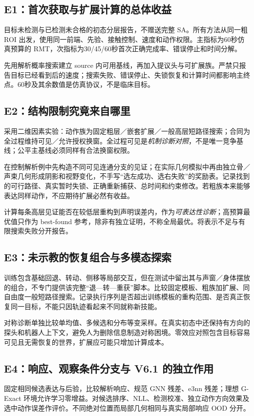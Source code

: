\documentclass[UTF8,fontset=fandol,11pt,a4paper]{ctexart}
\theoremstyle{plain}
\theoremstyle{definition}
\theoremstyle{remark}
\numberwithin{equation}{section}
\begin{document}
\subsection{E1：首次获取与扩展计算的总体收益}
目标未检测与已检测未合格的初态分层报告，不赠送完整 SA。所有方法从同一粗 ROI 出发，使用同一前端、先验、接触控制、速度和动作权限。主指标为60秒仿真预算的 RMT，次指标为30/45/60秒首次正确完成率、错误停止和时间分解。

先用解析概率搜索建立 source 内可用基线，再加入提议头与可扩展族。严禁只报告目标已经看到后的速度；搜索失败、错误停止、失锁恢复和计算时间都影响主终点。60秒及其余数值是仿真协议，不是临床目标。

\subsection{E2：结构限制究竟来自哪里}
采用二维因素实验：动作族为固定粗层／嵌套扩展／一般高层短路径搜索；合同为全过程维持可见／允许授权换窗。全过程可见是\emph{机制诊断对照}，不是唯一竞争基线；公平主基线必须同样有合法换窗权限。

在控制解析例中先构造不同可见连通分支的见证；在实际几何模拟中再由独立骨／声束几何形成阴影和视野变化，不手写“选左成功、选右失败”的奖励表。记录找到的可行路径、真实暂时失锁、正确重新捕获、总时间和约束修改。若粗族本来能够表达同样动作，不应期待扩展必然有收益。

计算每条高层见证能否在较低层重构到声明误差内，作为\emph{可表达性诊断}；高预算最优值只作为 best-found 参考，除非有独立证明，不称全局最优。将表示不足与有限搜索失败分开报告。

\subsection{E3：未示教的恢复组合与多模态探索}
训练包含基础回退、转动、侧移等局部交互，但在测试中留出其与声窗／身体摆放的组合，不专门提供该完整“退—转—重获”脚本。比较固定模板、粗族加扩展、同自由度一般短路径搜索。记录执行序列是否超出训练模板的重构范围、是否真正恢复同一目标，不能只因轨迹看起来不同就称新技能。

对称诊断单独比较单均值、多候选和分布等变采样。在真实初态中还保持有方向的探头和机器人上下文，避免人为删除信息制造对称困境。零效应对照包含目标容易可见且无需恢复的世界，扩展应可能只增加计算成本。

\subsection{E4：响应、观察条件分支与 V6.1 的独立作用}
固定相同候选表达与后验，比较解析响应、规范 GNN 残差、e3nn 残差；理想 G-Exact 环境允许学习零增益。对候选排序、NLL、检测校准、独立动作方向效果及选中动作误差作评价。不同绝对位置而局部几何相同与真实局部响应 OOD 分开。
\end{document}
